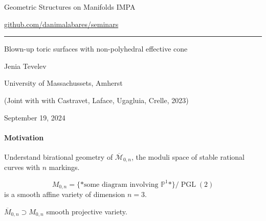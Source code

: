 


\begin{minipage}{\textwidth}
	\begin{minipage}{1\textwidth}
		Geometric Structures on Manifolds \hfill IMPA
		
		{\small\hfill\href{https://github.com/danimalabares/seminars}{github.com/danimalabares/seminars}}

		
	\end{minipage}
\end{minipage}\vspace{.2cm}\hrule

\vspace{10pt}

{\Huge Blown-up toric surfaces with non-polyhedral effective cone}

\hfill{\Large Jenia Tevelev}

{\Large \hfill University of Massachussets, Amherst}

\hfill{\large (Joint with with Castravet, Laface, Ugagluia, Crelle, 2023)}

\hfill{\large September 19, 2024}

\tableofcontents

\paragraph{Motivation} Understand birational geometry of $\overline{\mathcal{M}}_{0,n}$, the moduli space of stable rational curves with $n$ markings.

\[M_{0,n}=\{\text{*some diagram involving $\mathbb{P}^1$*} \} /\operatorname{PGL}(2)\]
is a smooth affine variety of dimension $n=3$.

 $\overline{M}_{0,n}\supset M_{0,n}$ smooth projective variety.

